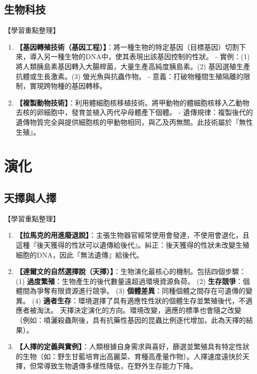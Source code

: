 \documentclass[11pt,a4paper]{article}
\begin{document}
\subsection{生物科技}
\begin{learningpoints}{【學習重點整理】}
\begin{enumerate}[label=\arabic*.]
  \item \textbf{【基因轉殖技術（基因工程）】}：將一種生物的特定基因（目標基因）切割下來，導入另一種生物的DNA中，使其表現出該基因控制的性狀。
  - 實例：(1) 將人類胰島素基因轉入大腸桿菌，大量生產高純度胰島素。(2) 基因選殖生產抗體或生長激素。(3) 螢光魚與抗蟲作物。
  - 意義：打破物種間生殖隔離的限制，實現跨物種的基因轉移。
  \item \textbf{【複製動物技術】}：利用體細胞核移植技術。將甲動物的體細胞核移入乙動物去核的卵細胞中，發育並植入丙代孕母體產下個體。
  - 遺傳規律：複製後代的遺傳物質完全與提供細胞核的甲動物相同，與乙及丙無關。此技術屬於『無性生殖』。
\end{enumerate}
\end{learningpoints}

\newpage
\section{演化}
\subsection{天擇與人擇}
\begin{learningpoints}{【學習重點整理】}
\begin{enumerate}[label=\arabic*.]
  \item \textbf{【拉馬克的用進廢退說】}：主張生物器官經常使用會發達，不使用會退化，且這種『後天獲得的性狀可以遺傳給後代』。糾正：後天獲得的性狀未改變生殖細胞的DNA，因此『無法遺傳』給後代。
  \item \textbf{【達爾文的自然選擇說（天擇）】}：生物演化最核心的機制。包括四個步驟：
  (1) \textbf{過度繁殖}：生物產生的後代數量遠超過環境資源負荷。
  (2) \textbf{生存競爭}：個體間為爭奪有限資源進行競爭。
  (3) \textbf{個體差異}：同種個體之間存在可遺傳的變異。
  (4) \textbf{適者生存}：環境選擇了具有適應性性狀的個體生存並繁殖後代，不適應者被淘汰。
  天擇決定演化的方向。環境改變，適應的標準也會隨之改變（例如：噴灑殺蟲劑後，具有抗藥性基因的昆蟲比例逐代增加，此為天擇的結果）。
  \item \textbf{【人擇的定義與實例】}：人類根據自身需求與喜好，篩選並繁殖具有特定性狀的生物（如：野生甘藍培育出高麗菜、育種高產量作物）。人擇速度遠快於天擇，但常導致生物遺傳多樣性降低，在野外生存能力下降。
\end{enumerate}
\end{learningpoints}
\end{document}
